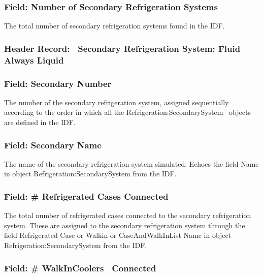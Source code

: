 \subsubsection{Field: Number of Secondary Refrigeration Systems}\label{field-number-of-secondary-refrigeration-systems}

The total number of secondary refrigeration systems found in the IDF.

\subsubsection{Header Record:~ Secondary Refrigeration System: Fluid Always Liquid}\label{header-record-secondary-refrigeration-system-fluid-always-liquid}

\subsubsection{Field: Secondary Number}\label{field-secondary-number-1}

The number of the secondary refrigeration system, assigned sequentially according to the order in which all the Refrigeration:SecondarySystem~ objects are defined in the IDF.

\subsubsection{Field: Secondary Name}\label{field-secondary-name}

The name of the secondary refrigeration system simulated. Echoes the field Name in object Refrigeration:SecondarySystem from the IDF.

\subsubsection{Field: \# Refrigerated Cases Connected}\label{field-refrigerated-cases-connected-2}

The total number of refrigerated cases connected to the secondary refrigeration system. These are assigned to the secondary refrigeration system through the field Refrigerated Case or Walkin or CaseAndWalkInList Name in object Refrigeration:SecondarySystem from the IDF.

\subsubsection{Field: \# WalkInCoolers~ Connected}\label{field-walkincoolers-connected-2}

